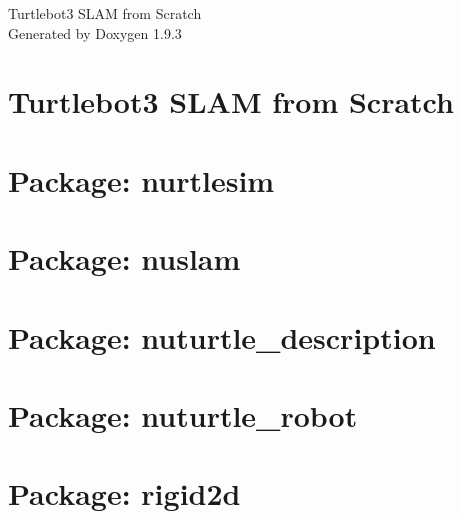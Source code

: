 \documentclass[twoside]{book}
\newcommand{\+}{\discretionary{\mbox{\scriptsize$\hookleftarrow$}}{}{}}
\newcommand{\clearemptydoublepage}{%
    \newpage{\pagestyle{empty}\cleardoublepage}%
  }
\begin{document}
  \raggedbottom
    \hypersetup{pageanchor=false,
                bookmarksnumbered=true,
                pdfencoding=unicode
               }
  \begin{titlepage}
  \vspace*{7cm}
  \begin{center}%
  {\Large Turtlebot3 SLAM from Scratch}\\
  \vspace*{1cm}
  {\large Generated by Doxygen 1.9.3}\\
  \end{center}
  \end{titlepage}
  \clearemptydoublepage
  \tableofcontents
  \clearemptydoublepage
  \hypersetup{pageanchor=true}
\chapter{Turtlebot3 SLAM from Scratch}
\label{index}\hypertarget{index}{}
\chapter{Package\+: nurtlesim}
\label{md_nurtlesim_README}

\chapter{Package\+: nuslam}
\label{md_nuslam_README}

\chapter{Package\+: nuturtle\+\_\+description}
\label{md_nuturtle_description_README}

\chapter{Package\+: nuturtle\+\_\+robot}
\label{md_nuturtle_robot_README}

\chapter{Package\+: rigid2d}
\label{md_rigid2d_README}

\end{document}
